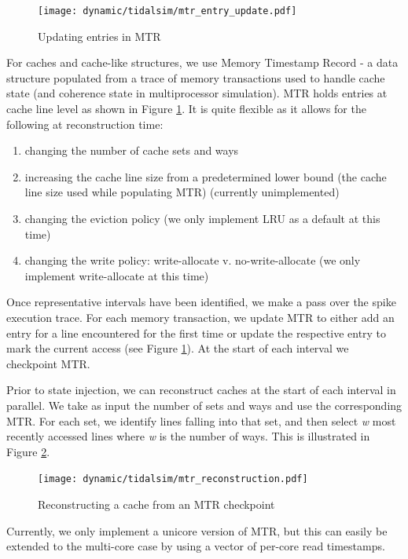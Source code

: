 \documentclass[sigplan,nonacm,10pt]{acmart}
\begin{document}
\begin{figure}
  \texttt{[image: dynamic/tidalsim/mtr\_entry\_update.pdf]}
  \caption{Updating entries in MTR}
  \label{fig:mtr_entry_update}
\end{figure}

For caches and cache-like structures, we use Memory Timestamp Record \cite{barr2005accelerating} - a data structure populated from a trace of memory transactions used to handle cache state (and coherence state in multiprocessor simulation). MTR holds entries at cache line level as shown in Figure \ref{fig:mtr_entry_update}.
It is quite flexible as it allows for the following at reconstruction time:
\begin{enumerate}
  \item changing the number of cache sets and ways
  \item increasing the cache line size from a predetermined lower bound (the cache line size used while populating MTR) (currently unimplemented)
  \item changing the eviction policy (we only implement LRU as a default at this time)
  \item changing the write policy: write-allocate v. no-write-allocate (we only implement write-allocate at this time)
\end{enumerate}

Once representative intervals have been identified, we make a pass over the spike execution trace. For each memory transaction, we update MTR to either add an entry for a line encountered for the first time or update the respective entry to mark the current access (see Figure \ref{fig:mtr_entry_update}). At the start of each interval we checkpoint MTR.

Prior to state injection, we can reconstruct caches at the start of each interval in parallel. We take as input the number of sets and ways and use the corresponding MTR. For each set, we identify lines falling into that set, and then select \textit{w} most recently accessed lines where \textit{w} is the number of ways. This is illustrated in Figure \ref{fig:mtr_reconstruction}.

\begin{figure}
  \texttt{[image: dynamic/tidalsim/mtr\_reconstruction.pdf]}
  \caption{Reconstructing a cache from an MTR checkpoint}
  \label{fig:mtr_reconstruction}
\end{figure}

Currently, we only implement a unicore version of MTR, but this can easily be extended to the multi-core case by using a vector of per-core read timestamps.
\end{document}
